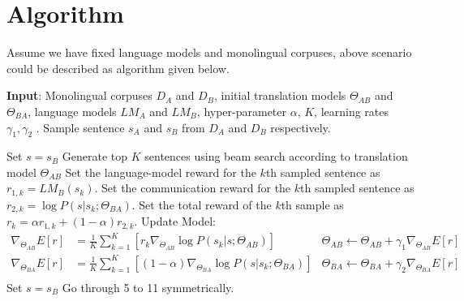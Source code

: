 \documentclass[11pt]{article}
\begin{document}
{\part{Algorithm}
Assume we have fixed language models and monolingual corpuses, above scenario could be described as algorithm given below.
\begin{algorithm}
\begin{algorithmic}[1]
\State \textbf{Input}: Monolingual corpuses $D_A$ and $D_B$, initial translation models $\Theta_{AB}$ and $\Theta_{BA}$, language models $LM_A$ and $LM_B$, hyper-parameter $\alpha$, $K$, learning rates $\gamma_1,\gamma_2$ .
\Repeat
\State Sample sentence $s_A$ and $s_B$ from $D_A$ and $ D_B$ respectively.

\State Set $s = s_B$
\State Generate top $K$ sentences using beam search according to translation model $\Theta_{AB}$
\State Set the language-model reward for the $k$th sampled sentence as $r_{1,k}=LM_B(s_{k})$.
\State Set the communication reward for the $k$th sampled sentence as $r_{2,k}=\log P(s|s_{k};\Theta_{BA})$.
\State Set the total reward of the $k$th sample as $r_k = \alpha r_{1,k} + (1-\alpha)r_{2,k}$.
\EndFor
\State Update Model:
\begin{align*}
\nabla_{\Theta_{AB}} E[r] &= \frac{1}{K}\sum^K_{k=1}[r_k\nabla_{\Theta_{AB}}\log P(s_{k}|s; \Theta_{AB})]&\Theta_{AB} \leftarrow\Theta_{AB} + \gamma_1\nabla_{\Theta_{AB}} E[r]\\
\nabla_{\Theta_{BA}} E[r] &= \frac{1}{K}\sum^K_{k=1} [(1-\alpha)\nabla_{\Theta_{BA}} \log P(s|s_{k};\Theta_{BA})]&\Theta_{BA} \leftarrow\Theta_{BA} + \gamma_2\nabla_{\Theta_{BA}} E[r]\\
\end{align*}
\State Set $s = s_B$
\State Go through 5 to 11 symmetrically.
\end{algorithmic}
\end{algorithm}
}
\end{document}
